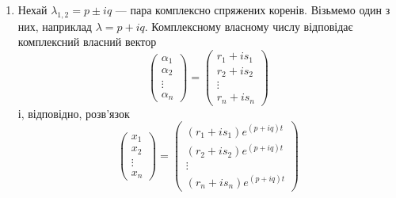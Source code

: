 \begin{enumerate}
\item Нехай $\lambda_{1,2} = p \pm i q$ --- пара комплексно спряжених коренів. Візьмемо один з них, наприклад $\lambda = p + i q$. Комплексному власному числу відповідає комплексний власний вектор
\begin{equation*}
	\begin{pmatrix} \alpha_1 \\ \alpha_2 \\ \vdots \\ \alpha_n \end{pmatrix} =
	\begin{pmatrix} r_1 + i s_1 \\ r_2 + i s_2 \\ \vdots \\ r_n + i s_n \end{pmatrix}
\end{equation*}
і, відповідно, розв'язок
\begin{equation*}
	\begin{pmatrix} x_1 \\ x_2 \\ \vdots \\ x_n \end{pmatrix} =
	\begin{pmatrix} (r_1 + i s_1) e^{(p + i q) t} \\ (r_2 + i s_2) e^{(p + i q) t} \\ \vdots \\ (r_n + i s_n) e^{(p + i q) t} \end{pmatrix}
\end{equation*}


\end{enumerate}
